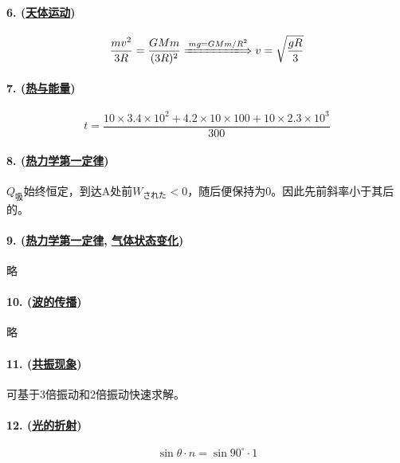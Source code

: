 \paragraph{6. (\hyperref[subsec:天体运动]{天体运动})}

\begin{equation*}
    \frac{mv^2}{3R}=\frac{GMm}{(3R)^2}
    \xLongrightarrow{mg=GMm/R^2}
    v=\sqrt{\frac{gR}{3}}
\end{equation*}

\paragraph{7. (\hyperref[sec:热与能量]{热与能量})}

\begin{equation*}
    t=\frac{10\times3.4\times10^2+4.2\times10\times100+10\times2.3\times10^3}{300}
\end{equation*}

\paragraph{8. (\hyperref[subsec:热力学第一定律]{热力学第一定律})} $Q_\textrm{吸}$始终恒定，到达A处前$W_\textrm{された}<0$，随后便保持为0。因此先前斜率小于其后的。

\paragraph{9. (\hyperref[subsec:热力学第一定律]{热力学第一定律}, \hyperref[subsec:气体状态变化]{气体状态变化})} 略

\paragraph{10. (\hyperref[subsec:波的传播]{波的传播})} 略

\paragraph{11. (\hyperref[subsec:共振现象]{共振现象})} 可基于3倍振动和2倍振动快速求解。

\paragraph{12. (\hyperref[subsec:光的折射]{光的折射})}

\begin{equation*}
    \sin\theta\cdot n=\sin90^\circ\cdot 1
\end{equation*}

